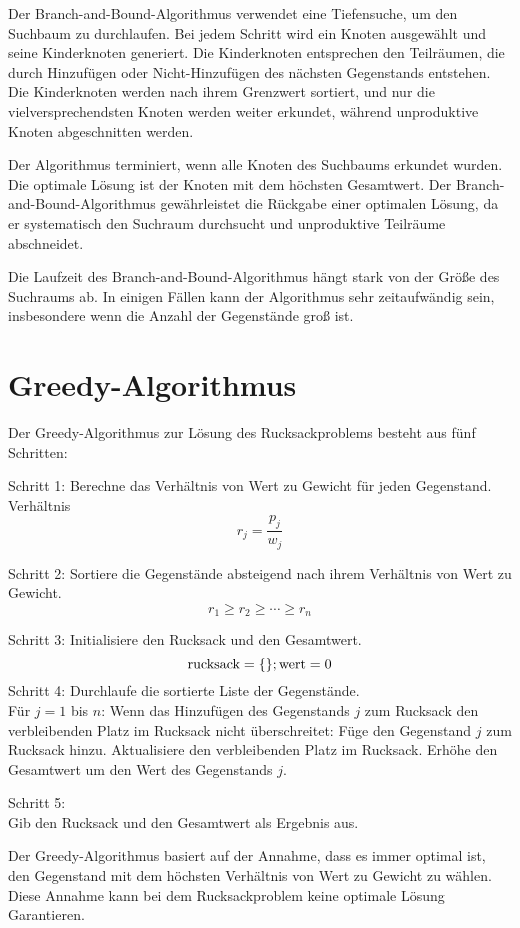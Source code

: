 Der Branch-and-Bound-Algorithmus verwendet eine Tiefensuche, 
um den Suchbaum zu durchlaufen. Bei jedem Schritt wird ein 
Knoten ausgewählt und seine Kinderknoten generiert. Die 
Kinderknoten entsprechen den Teilräumen, die durch 
Hinzufügen oder Nicht-Hinzufügen des nächsten Gegenstands 
entstehen. Die Kinderknoten werden nach ihrem Grenzwert 
sortiert, und nur die vielversprechendsten Knoten werden 
weiter erkundet, während unproduktive Knoten abgeschnitten 
werden.

Der Algorithmus terminiert, wenn alle Knoten des Suchbaums 
erkundet wurden. Die optimale Lösung ist der Knoten mit dem 
höchsten Gesamtwert. Der Branch-and-Bound-Algorithmus 
gewährleistet die Rückgabe einer optimalen Lösung, da er 
systematisch den Suchraum durchsucht und unproduktive 
Teilräume abschneidet.

Die Laufzeit des 
Branch-and-Bound-Algorithmus hängt stark von der Größe des 
Suchraums ab. In einigen Fällen kann der Algorithmus 
sehr zeitaufwändig sein, insbesondere wenn die Anzahl der 
Gegenstände groß ist.\ \cite[vgl.]{Martello1987}

\section{Greedy-Algorithmus}
Der Greedy-Algorithmus zur Lösung des Rucksackproblems besteht 
aus fünf Schritten:

Schritt 1: Berechne das Verhältnis von Wert zu Gewicht für 
jeden Gegenstand.
Verhältnis \[r_j = \frac{p_j}{w_j}\]

Schritt 2: Sortiere die Gegenstände absteigend nach ihrem 
Verhältnis von Wert zu Gewicht.
\[r_1 \geq r_2 \geq \cdots \geq r_n\]

Schritt 3: Initialisiere den Rucksack und den Gesamtwert.
\[   \text{rucksack} = \{\}; \\
    \text{wert} = 0 \]
Schritt 4: Durchlaufe die sortierte Liste der Gegenstände.\\
Für $j = 1$ bis $n$: 
Wenn das Hinzufügen des Gegenstands $j$ zum Rucksack den 
verbleibenden Platz im Rucksack nicht überschreitet:
Füge den Gegenstand $j$ zum Rucksack hinzu.
Aktualisiere den verbleibenden Platz im Rucksack.
Erhöhe den Gesamtwert um den Wert des Gegenstands $j$.

Schritt 5: \\Gib den Rucksack und den Gesamtwert als Ergebnis 
aus.

Der Greedy-Algorithmus basiert auf der Annahme, dass es 
immer optimal ist, den Gegenstand mit dem höchsten Verhältnis 
von Wert zu Gewicht zu wählen. Diese Annahme kann bei dem Rucksackproblem
keine optimale Lösung Garantieren.


